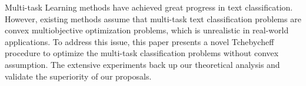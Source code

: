 Multi-task Learning methods have achieved great progress in text classification. However, existing methods assume that multi-task text classification problems are convex multiobjective optimization problems, which is unrealistic in real-world applications. To address this issue, this paper presents a novel Tchebycheff procedure to optimize the multi-task classification problems without convex assumption. The extensive experiments back up our theoretical analysis and validate the superiority of our proposals.

